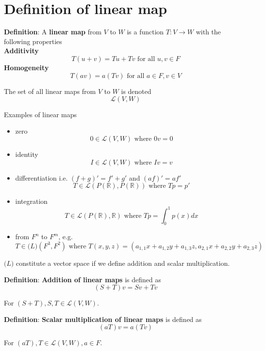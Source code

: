 \documentclass[a4paper, 10pt]{report}
\begin{document}
\section{Definition of linear map}
\begin{framed}
   \textbf{Definition}: A \textbf{linear map} from $V$ to $W$ is a function $T: V \rightarrow W$ with the following properties \\

   \textbf{Additivity}
   \[
     T(u + v) = Tu + Tv \text{ for all } u, v \in F
   \] 
   \textbf{Homogeneity}
   \[
     T(av) = a (Tv) \text{ for all } a \in F, v \in V
   \] 

   The set of all linear maps from $V$ to $W$ is denoted
   \[
      \mathcal{L}(V, W)
   \] 
\end{framed}

Examples of linear maps
\begin{itemize}
   \item zero
      \[
         0 \in \mathcal{L}(V, W) \text{ where } 0v = 0
      \] 
   \item identity
      \[
         I \in \mathcal{L}(V, W) \text{ where } Iv = v
      \] 
   \item differentiation i.e. $(f+g)' = f' + g'$ and $(af)' = af'$
      \[
         T \in \mathcal{L}(P(\mathbb{R}), P(\mathbb{R})) \text{ where }
         Tp = p'
      \] 
   \item integration 
      \[
         T \in \mathcal{L}(P(\mathbb{R}),\mathbb{R}) \text{ where }
         Tp = \int_{0}^{1} p(x) dx 
      \] 
   \item from $F^n$ to $F^m$, e.g.
      \[
         T \in \mathcal(L) \left( F^3, F^2 \right) \text{ where } T(x, y, z) = (a_{1, 1}x + a_{1, 2}y + a_{1, 3}z, a_{2, 1}x + a_{2, 2}y + a_{2, 3}z)
      \] 
\end{itemize}

$\mathcal(L)$ constitute a vector space if we define addition and scalar multiplication. \\

\begin{framed}
   \textbf{Definition}: \textbf{Addition of linear maps} is defined as
   \[
      (S + T) v = Sv + Tv
   \] 

   For $(S + T), S, T \in \mathcal{L}(V, W)$.
\end{framed}

\begin{framed}
   \textbf{Definition}: \textbf{Scalar multiplication of linear maps} is defined as
   \[
      (aT) v = a(Tv)
   \] 

   For $(aT), T \in \mathcal{L}(V, W), a \in F$.
\end{framed}
\end{document}

